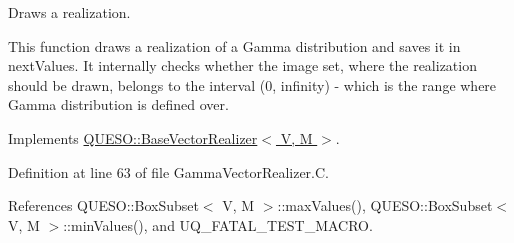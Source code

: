 Draws a realization. 

This function draws a realization of a Gamma distribution and saves it in {\ttfamily next\-Values}. It internally checks whether the image set, where the realization should be drawn, belongs to the interval (0, infinity) -\/ which is the range where Gamma distribution is defined over. 

Implements \hyperlink{class_q_u_e_s_o_1_1_base_vector_realizer_a6845173dd79a80ae11c86cde26e55817}{Q\-U\-E\-S\-O\-::\-Base\-Vector\-Realizer$<$ V, M $>$}.



Definition at line 63 of file Gamma\-Vector\-Realizer.\-C.



References Q\-U\-E\-S\-O\-::\-Box\-Subset$<$ V, M $>$\-::max\-Values(), Q\-U\-E\-S\-O\-::\-Box\-Subset$<$ V, M $>$\-::min\-Values(), and U\-Q\-\_\-\-F\-A\-T\-A\-L\-\_\-\-T\-E\-S\-T\-\_\-\-M\-A\-C\-R\-O.


